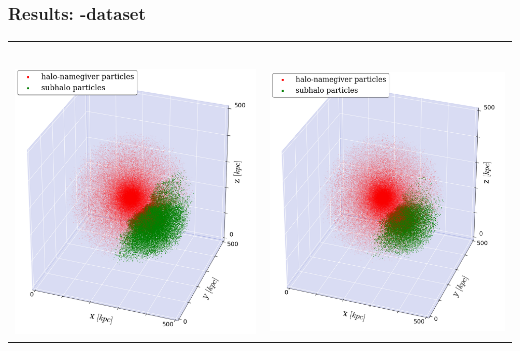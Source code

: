 \begin{frame}
	\frametitle{Results: \dt-dataset}
	
	\begin{tabular}{c c}
		\phewon\ 	& \simple \\[1.5em]
		{\includegraphics[width = .49\textwidth]{../report/images/dice-two/dice-two-plot-halo1451-phew.png}} \hspace*{-1em} 	& 
		{\includegraphics[width = .49\textwidth]{../report/images/dice-two/dice-two-plot-halo1451-nosaddle.png}}
	\end{tabular}
\end{frame}





